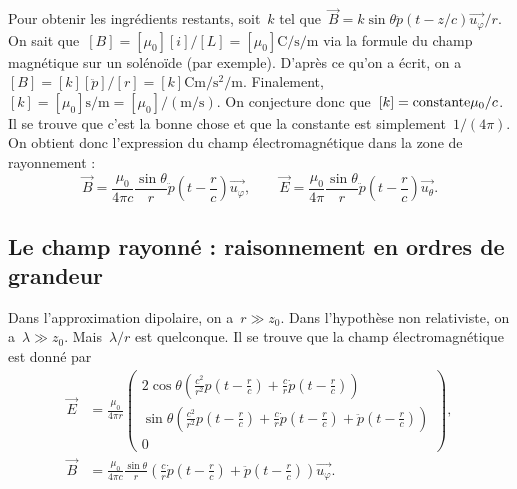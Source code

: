 Pour obtenir les ingrédients restants, soit~$k$ tel que~$\vec{B}=k\sin\theta\ddot{p}(t-z/c)\vec{u_{\varphi}}/r$. On sait que~$[B]=[\mu_0][i]/[L]=[\mu_0]\si{\coulomb\per\second\per\metre}$ via la formule du champ magnétique sur un solénoïde (par exemple). D'après ce qu'on a écrit, on a~$[B]=[k][\ddot{p}]/[r]=[k]\si{\coulomb\metre\per\second\squared}/\si{\metre}$. Finalement,~$[k]=[\mu_0]\si{\second\per\metre}=[\mu_0]/(\si{\metre\per\second})$. On conjecture donc que~$[k]={\rm constante}\mu_0/c$. Il se trouve que c'est la bonne chose et que la constante est simplement~$1/(4\pi)$. On obtient donc l'expression du champ électromagnétique dans la zone de rayonnement :
\begin{equation*}
    \boxed{
        \vec{B}=\frac{\mu_0}{4\pi c}\frac{\sin\theta}{r}\ddot{p}\left(t-\frac{r}{c}\right)\vec{u_{\varphi}},\qquad
        \vec{E}=\frac{\mu_0}{4\pi}\frac{\sin\theta}{r}\ddot{p}\left(t-\frac{r}{c}\right)\vec{u_{\theta}}.
    }
\end{equation*}

\subsection{Le champ rayonné : raisonnement en ordres de grandeur}

Dans l'approximation dipolaire, on a~$r\gg z_0$. Dans l'hypothèse non relativiste, on a~$\lambda\gg z_{0}$. Mais~$\lambda/r$ est quelconque. Il se trouve que la champ électromagnétique est donné par
\begin{equation*}
    \begin{aligned}
        \vec{E}&=\frac{\mu_0}{4\pi r}\begin{pmatrix}
            2\cos\theta\left(
                \frac{c^{2}}{r^{2}}p\left(t-\frac{r}{c}\right)+\frac{c}{r}\dot{p}\left(t-\frac{r}{c}\right)
            \right)\\
            \sin\theta\left(
                \frac{c^{2}}{r^{2}}p\left(t-\frac{r}{c}\right)+\frac{c}{r}\dot{p}\left(t-\frac{r}{c}\right)+\ddot{p}\left(t-\frac{r}{c}\right)
            \right)\\
            0
        \end{pmatrix},\\
        \vec{B}&=\frac{\mu_0}{4\pi c}\frac{\sin\theta}{r}\left(
            \frac{c}{r}\dot{p}\left(t-\frac{r}{c}\right)+\ddot{p}\left(t-\frac{r}{c}\right)
        \right)\vec{u_{\varphi}}.
    \end{aligned}
\end{equation*}

